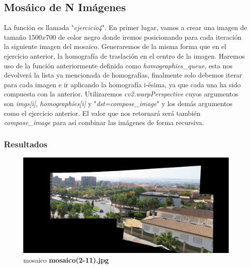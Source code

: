 \documentclass{article}
\begin{document}
\subsection{Mosáico de N Imágenes}
La función es llamada "\textit{ejercicio4}". En primer lugar, vamos a crear una imagen de tamaño $1500x700$ de color negro donde iremos posicionando para cada iteración la siguiente imagen del mosaico.
\newline
\newline
Generaremos de la misma forma que en el ejercicio anterior, la homografía de traslación en el centro de la imagen. Haremos uso de la función anteriormente definida como \textit{homographies\_queue}, esta nos devolverá la lista ya mencionada de homografías, finalmente solo debemos iterar para cada imagen e ir aplicando la homografía i-ésima, ya que cada una ha sido compuesta con la anterior.
\newline
\newline
Utilizaremos \textit{cv2.warpPerspective} cuyos argumentos son \textit{imgs[i]}, \textit{homographies[i]} y "\textit{dst=compose\_image}" y los demás argumentos como el ejercicio anterior. El valor que nos retornará será también \textit{compose\_image} para así combinar las imágenes de forma recursiva.

\newpage

\subsubsection{Resultados}

\begin{figure}[hbt!]
	\centering
	\includegraphics[width=1.0\textwidth]{../assets/Ejercicio4.png}
	\caption{mosaico \textbf{mosaico(2-11).jpg}}
\end{figure}
\end{document}
